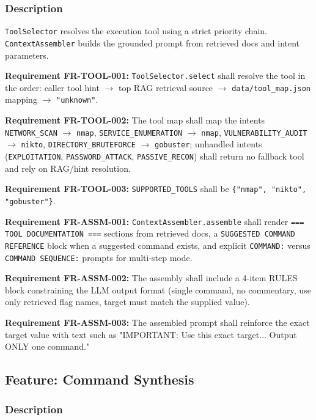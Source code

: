 \documentclass[10pt,journal,onecolumn]{IEEEtran}
\newcommand{\reqid}[1]{\textbf{#1}}
\begin{document}
\subsubsection{Description}

\texttt{ToolSelector} resolves the execution tool using a strict priority chain. \texttt{ContextAssembler} builds the grounded prompt from retrieved docs and intent parameters.

\reqid{Requirement FR-TOOL-001:} \texttt{ToolSelector.select} shall resolve the tool in the order: caller tool hint $\rightarrow$ top RAG retrieval source $\rightarrow$ \texttt{data/tool\_map.json} mapping $\rightarrow$ \texttt{"unknown"}.

\reqid{Requirement FR-TOOL-002:} The tool map shall map the intents \texttt{NETWORK\_SCAN} $\rightarrow$ \texttt{nmap}, \texttt{SERVICE\_ENUMERATION} $\rightarrow$ \texttt{nmap}, \texttt{VULNERABILITY\_AUDIT} $\rightarrow$ \texttt{nikto}, \texttt{DIRECTORY\_BRUTEFORCE} $\rightarrow$ \texttt{gobuster}; unhandled intents (\texttt{EXPLOITATION}, \texttt{PASSWORD\_ATTACK}, \texttt{PASSIVE\_RECON}) shall return no fallback tool and rely on RAG/hint resolution.

\reqid{Requirement FR-TOOL-003:} \texttt{SUPPORTED\_TOOLS} shall be \texttt{\{"nmap", "nikto", "gobuster"\}}.

\reqid{Requirement FR-ASSM-001:} \texttt{ContextAssembler.\allowbreak assemble} shall render \texttt{=== TOOL DOCUMENTATION ===} sections from retrieved docs, a \texttt{SUGGESTED COMMAND REFERENCE} block when a suggested command exists, and explicit \texttt{COMMAND:} versus \texttt{COMMAND SEQUENCE:} prompts for multi-step mode.

\reqid{Requirement FR-ASSM-002:} The assembly shall include a 4-item RULES block constraining the LLM output format (single command, no commentary, use only retrieved flag names, target must match the supplied value).

\reqid{Requirement FR-ASSM-003:} The assembled prompt shall reinforce the exact target value with text such as "IMPORTANT: Use this exact target... Output ONLY one command."

\subsection{Feature: Command Synthesis}

\subsubsection{Description}
\end{document}
